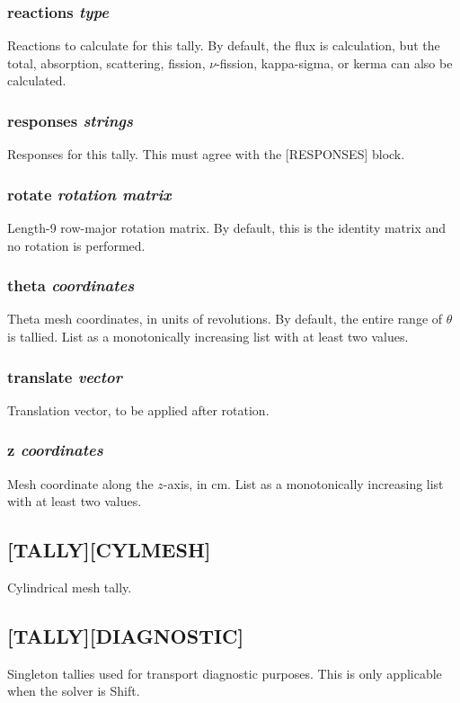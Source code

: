 \documentclass[10pt]{article}
\begin{document}
\subsubsection{reactions \textit{type}}
Reactions to calculate for this tally. By default, the flux is calculation, but the total, absorption, scattering, fission, \(\nu\)-fission, kappa-sigma, or kerma can also be calculated.

\subsubsection{responses \textit{strings}}
Responses for this tally. This must agree with the [RESPONSES] block. 

\subsubsection{rotate \textit{rotation matrix}}
Length-9 row-major rotation matrix. By default, this is the identity matrix and no rotation is performed.

\subsubsection{theta \textit{coordinates}}
Theta mesh coordinates, in units of revolutions. By default, the entire range of \(\theta\) is tallied. List as a monotonically increasing list with at least two values.

\subsubsection{translate \textit{vector}}
Translation vector, to be applied after rotation. 

\subsubsection{z \textit{coordinates}}
Mesh coordinate along the \(z\)-axis, in cm. List as a monotonically increasing list with at least two values. 

\subsection{[TALLY][CYLMESH]}
Cylindrical mesh tally. 

\subsection{[TALLY][DIAGNOSTIC]}
Singleton tallies used for transport diagnostic purposes. This is only applicable when the solver is Shift.
\end{document}
